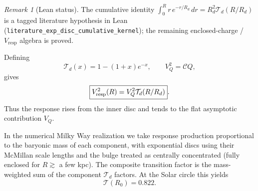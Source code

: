 \documentclass[11pt]{article}
\theoremstyle{definition}
\theoremstyle{remark}
\newtheorem{remark}[theorem]{Remark}
\begin{document}
\begin{remark}[Lean status]
The cumulative identity $\int_0^R r\,e^{-r/R_d}\,dr=R_d^2\mathcal T_d(R/R_d)$ is a tagged literature hypothesis in Lean (\texttt{literature\_exp\_disc\_cumulative\_kernel}); the remaining enclosed-charge / $V_{\mathrm{resp}}$ algebra is proved.
\end{remark}
Defining
\begin{equation}
\mathcal T_d(x)=1-(1+x)e^{-x},\qquad V_Q^2=\mathcal C Q,
\end{equation}
gives
\begin{equation}
\label{eq:Vresp-exp}
\boxed{V_{\rm resp}^2(R)=V_Q^2\mathcal T_d(R/R_d)}.
\end{equation}
Thus the response rises from the inner disc and tends to the flat asymptotic contribution $V_Q$.

In the numerical Milky Way realization we take response production proportional to the baryonic mass of each component, with exponential discs using their McMillan scale lengths and the bulge treated as centrally concentrated (fully enclosed for $R\gtrsim$ a few kpc).
The composite transition factor is the mass-weighted sum of the component $\mathcal T_d$ factors.
At the Solar circle this yields
\begin{equation}
\mathcal T(R_0)=0.822.
\end{equation}
\end{document}
